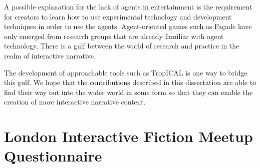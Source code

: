 \documentclass[11pt]{report}
\begin{document}
A possible explanation for the lack of agents in entertainment is the
requirement for creators to learn how to use experimental technology and
development techniques in order to use the agents. Agent-oriented games such as
Fa\c{c}ade have only emerged from research groups that are already familiar with
agent technology. There is a gulf between the world of research and practice in
the realm of interactive narrative.

The development of approachable tools such as TropICAL is one way to bridge
this gulf. We hope that the contributions described in this dissertation are
able to find their way out into the wider world in some form so that they can
enable the creation of more interactive narrative content.


\appendix

\chapter{London Interactive Fiction Meetup Questionnaire}
\label{appendix:questionnaire}
\end{document}

